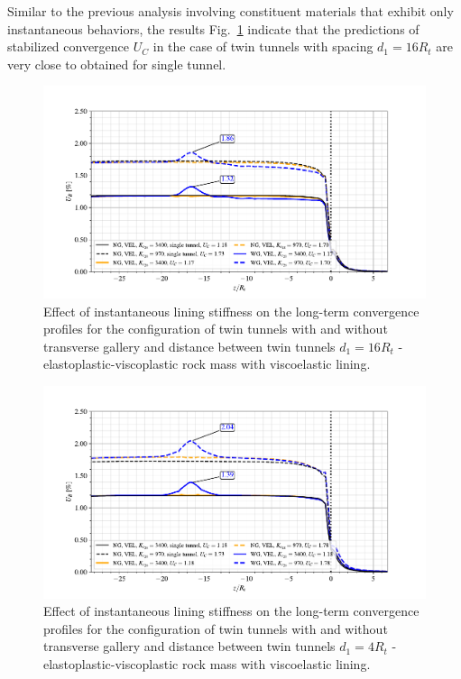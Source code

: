 \documentclass[a4paper,fleqn]{cas-sc}
\begin{document}
Similar to the previous analysis involving constituent materials that exhibit only instantaneous behaviors, the results Fig.~\ref{EPVP_VEL_d1_16Ri} indicate that the predictions of stabilized convergence $U_C$ in the case of twin tunnels with spacing $d_1=16R_t$ are very close to obtained for single tunnel.

\begin{figure}[h!]
	\centering
	\includegraphics[scale=0.9]{Convergence Profiles - EPVP_VEL_d1_16Ri_anotate.pdf}
	\caption{Effect of instantaneous lining stiffness on the long-term convergence profiles for the configuration of twin tunnels with and without transverse gallery and distance between twin tunnels $d_1=16R_t$ - elastoplastic-viscoplastic rock mass with viscoelastic lining.}
	\label{EPVP_VEL_d1_16Ri}
\end{figure}
\FloatBarrier
\begin{figure}[h!]
	\centering
	\includegraphics[scale=0.9]{Convergence Profiles - EPVP_VEL_d1_4Ri_anotate.pdf}
	\caption{Effect of instantaneous lining stiffness on the long-term convergence profiles for the configuration of twin tunnels with and without transverse gallery and distance between twin tunnels $d_1=4R_t$ - elastoplastic-viscoplastic rock mass with viscoelastic lining.}
	\label{EPVP_VEL_d1_4Ri}
\end{figure}
\FloatBarrier
\end{document}
